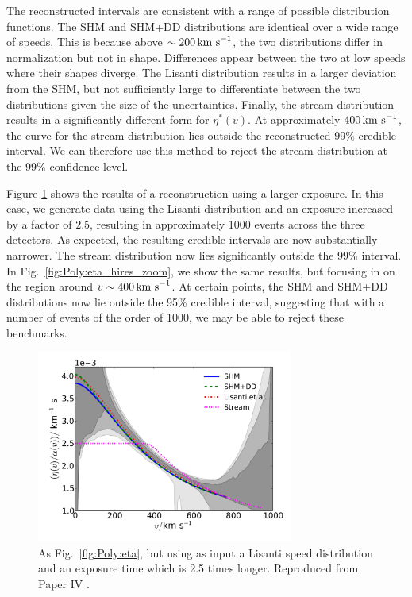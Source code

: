 The reconstructed intervals are consistent with a range of possible distribution functions. The SHM and SHM+DD distributions are identical over a wide range of speeds. This is because above $\sim 200 \,\textrm{km s}^{-1}$, the two distributions differ in normalization but not in shape. Differences appear between the two at low speeds where their shapes diverge. The Lisanti \etal distribution results in a larger deviation from the SHM, but not sufficiently large to differentiate between the two distributions given the size of the uncertainties. Finally, the stream distribution results in a significantly different form for $\eta^*(v)$. At approximately $400 \,\textrm{km s}^{-1}$, the curve for the stream distribution lies outside the reconstructed 99\% credible interval. We can therefore use this method to reject the stream distribution at the 99\% confidence level.

Figure \ref{fig:Poly:eta_hires} shows the results of a reconstruction using a larger exposure. In this case, we generate data using the Lisanti \etal distribution and an exposure increased by a factor of $2.5$, resulting in approximately 1000 events across the three detectors. As expected, the resulting credible intervals are now substantially narrower. The stream distribution now lies significantly outside the 99\% interval. In Fig.~\ref{fig:Poly:eta_hires_zoom}, we show the same results, but focusing in on the region around $v \sim 400 \,\textrm{km s}^{-1}$. At certain points, the SHM and SHM+DD distributions now lie outside the 95\% credible interval, suggesting that with a number of events of the order of 1000, we may be able to reject these benchmarks.

\begin{figure}[t]
\centering
  \includegraphics[width=0.75\textwidth]{Poly/LIS_hires.pdf}
  \caption[As Fig.~\ref{fig:Poly:eta}, but using as input a Lisanti \etal speed distribution and a longer exposure time]{As Fig.~\ref{fig:Poly:eta}, but using as input a Lisanti \etal speed distribution and an exposure time which is 2.5 times longer. Reproduced from Paper IV \cite{Kavanagh:2014}.}
  \label{fig:Poly:eta_hires}
\end{figure}



